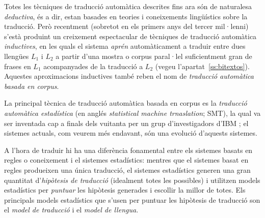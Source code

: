 

Totes les tècniques de traducció automàtica descrites fins ara són de
naturalesa \emph{deductiva}, és a dir, estan basades en teories i
coneixements lingüístics sobre la traducció. Però recentment (sobretot
en els primers anys del tercer mil·lenni) s'està produint un
creixement espectacular de tècniques de traducció automàtica
\emph{inductives}, en les quals el sistema \emph{aprén} automàticament
a traduir entre dues llengües $L_1$ i $L_2$ a partir d'una mostra o
corpus paral·lel suficientment gran de frases en $L_1$ acompanyades de
la traducció a $L_2$ (vegeu l'apartat~\ref{ss:bitextos}). Aquestes
aproximacions inductives també reben el nom de \emph{traducció
  automàtica basada en corpus}.

La principal tècnica de traducció automàtica basada en corpus es la
\emph{traducció automàtica estadística} (en anglés \emph{statistical
  machine trnaslation}; SMT), la qual va ser inventada cap a finals
dels vuitanta per un grup d'investigadors d'IBM \citep{brown90j}; el
sistemes actuals, com veurem més endavant, són una evolució d'aquests
sistemes.

A l'hora de traduir hi ha una diferència fonamental entre els sistemes
basats en regles o coneixement i el sistemes estadístics: mentres que
el sistemes basat en regles produeixen una única traducció, el
sistemes estadístics generen una gran quantitat d'\emph{hipòtesis de
  traducció} (idealment totes les possibles) i utilitzen models
estadístics per \emph{puntuar} les hipòtesis generades i escollir la
millor de totes. Els principals models estadístics que s'usen per
puntuar les hipòtesis de traducció son el \emph{model de traducció} i
el \emph{model de llengua}.

